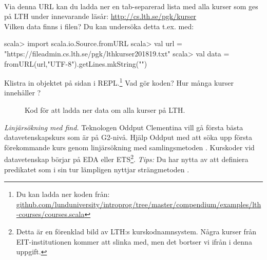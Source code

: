 \QUESTEND





\QUESTBEGIN

\Task \label{task:linsearch-lth}\what~

\Subtask Via denna URL kan du ladda ner en tab-separerad lista med alla kurser som ges på LTH under innevarande läsår: \url{http://cs.lth.se/pgk/kurser} \\Vilken data finns i filen? Du kan undersöka detta t.ex. med:
\begin{REPLnonum}
scala> import scala.io.Source.fromURL
scala> val url = "https://fileadmin.cs.lth.se/pgk/lthkurser201819.txt"
scala> val data = fromURL(url,"UTF-8").getLines.mkString("\n")
\end{REPLnonum}

\Subtask \label{subtask:download-lthcourses} Klistra in objektet  på sidan \pageref{lth-courses} i REPL.\footnote{Du kan ladda ner koden från: \\ \href{https://raw.githubusercontent.com/lunduniversity/introprog/master/compendium/examples/lth-courses/courses.scala}{github.com/lunduniversity/introprog/tree/master/compendium/examples/lth-courses/courses.scala}} Vad gör koden? Hur många kurser innehåller ?

\begin{figure}[h]
  \caption{Kod för att ladda ner data om alla kurser på LTH.}
  \label{lth-courses}
\end{figure}


\Subtask \emph{Linjärsökning med find.} Teknologen Oddput Clementina vill gå första bästa datavetenskapskurs som är på G2-nivå. Hjälp Oddput med att söka upp första förekommande kurs genom linjärsökning med samlingsmetoden . Kurskoder vid datavetenskap börjar på EDA eller ETS\footnote{Detta är en förenklad bild av LTH:s kurskodnamnsystem. Några kurser från EIT-institutionen  kommer att slinka med, men det bortser vi ifrån i denna uppgift.}. \emph{Tips:} Du har nytta av att definiera predikatet  som i sin tur lämpligen nyttjar strängmetoden .

